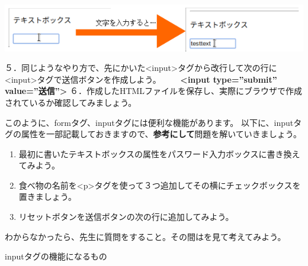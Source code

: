 \centering
\includegraphics[width=16.3cm]{text07-img/ome7-img037.png}
\flushleft

５．同じようなやり方で、先にかいた{\textless}input{\textgreater}タグから改行して次の行に{\textless}input{\textgreater}タグで送信ボタンを作成しよう。\newline
\ \ \ \ \textbf{{\textless}input type=”submit” value=”送信”{\textgreater}}
６．作成したHTMLファイルを保存し、実際にブラウザで作成されているか確認してみましょう。\newline


このように、formタグ、inputタグには便利な機能があります。\newline
以下に、inputタグの属性を一部記載しておきますので、\textbf{参考にして}問題を解いていきましょう。


\bigskip



\clearpage
{}\theQuestion\label{Q:HTML}\newline

\begin{enumerate}
	\item 最初に書いたテキストボックスの属性をパスワード入力ボックスに書き換えてみよう。
	\item 食べ物の名前を{\textless}p{\textgreater}タグを使って３つ追加してその横にチェックボックスを置きましょう。
	\item リセットボタンを送信ボタンの次の行に追加してみよう。
\end{enumerate}

\samepage

わからなかったら、先生に質問をすること。その間はを見て考えてみよう。

inputタグの機能になるもの


